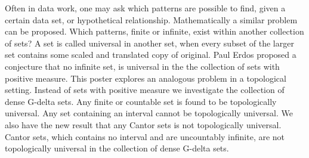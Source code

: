 \documentclass{amsart}
\begin{document}
Often in data work, one may ask which patterns are possible to find, given a certain data set, or hypothetical relationship.  Mathematically a similar problem can be proposed.  Which patterns, finite or infinite, exist within another collection of sets?  A set is called universal in another set, when every subset of the larger set contains some scaled and translated copy of original.  Paul Erdos proposed a conjecture that no infinite set, is universal in the the collection of sets with positive measure.  This poster explores an analogous problem in a topological setting. Instead of sets with positive measure we investigate the collection of dense G-delta sets.  Any finite or countable set is found to be topologically universal.  Any set containing an interval cannot be topologically universal.  We also have the new result that any Cantor sets is not topologically universal.  Cantor sets, which contains no interval and are uncountably infinite, are not topologically universal in the collection of dense G-delta sets.  

\end{document}
